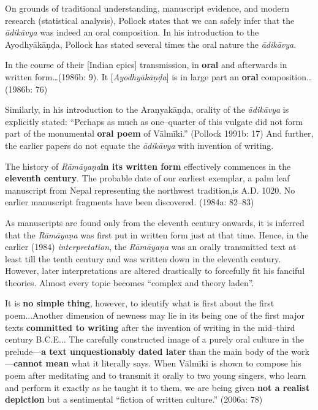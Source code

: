 On grounds of traditional understanding, manuscript evidence, and modern research (statistical analysis), Pollock states that we can safely infer that the \textit{ādikāvya} was indeed an oral composition. In his introduction to the Ayodhyākāṇḍa, Pollock has stated several times the oral nature the \textit{ādikāvya}.

\begin{myquote}
In the course of their [Indian epics] transmission, in \textbf{oral} and afterwards in written form…(1986b: 9). It [\textit{Ayodhyākāṇḍa}] is in large part an \textbf{oral} composition…(1986b: 76)
\end{myquote}

Similarly, in his introduction to the Araṇyakāṇḍa, orality of the \textit{ādikāvya} is explicitly stated: “Perhaps as much as one–quarter of this vulgate did not form part of the monumental \textbf{oral poem} of Vālmīki.” (Pollock 1991b: 17) And further, the earlier papers do not equate the \textit{ādikāvya} with invention of writing.

\begin{myquote}
The history of \textit{Rāmāyaṇa}\textbf{in its written form} effectively commences in the \textbf{eleventh century}. The probable date of our earliest exemplar, a palm leaf manuscript from Nepal\; representing\; the northwest tradition,\newpage is A.D. 1020. No earlier manuscript fragments have been discovered. (1984a: 82–83)
\end{myquote}

As manuscripts are found only from the eleventh century onwards, it is inferred that the \textit{Rāmāyaṇa }was first put in written form just at that time. Hence, in the earlier (1984) \textit{interpretation}, the \textit{Rāmāyaṇa }was an orally transmitted text at least till the tenth century and was written down in the eleventh century. However, later interpretations are altered drastically to forcefully fit his fanciful theories. Almost every topic becomes “complex and theory laden”.

\begin{myquote}
It is \textbf{no simple thing}, however, to identify what is ﬁrst about the ﬁrst poem...Another dimension of newness may lie in its being one of the ﬁrst major texts \textbf{committed to writing} after the invention of writing in the mid–third century B.C.E... The carefully constructed image of a purely oral culture in the prelude—\textbf{a text unquestionably dated later} than the main body of the work—\textbf{cannot mean} what it literally says. When Vālmīki is shown to compose his poem after meditating and to transmit it orally to two young singers, who learn and perform it exactly as he taught it to them, we are being given\textbf{ not a realist depiction }but a sentimental “ﬁction of written culture.” (2006a: 78)
\end{myquote}

